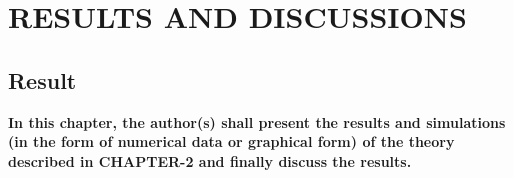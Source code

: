 
\chapter{RESULTS AND DISCUSSIONS}

\section{{\bf{Result}}}
{\bf\color{red}In this chapter, the author(s) shall present the results and simulations (in the form of numerical data or graphical form) of the theory described in CHAPTER-2 and finally discuss the results.
}




